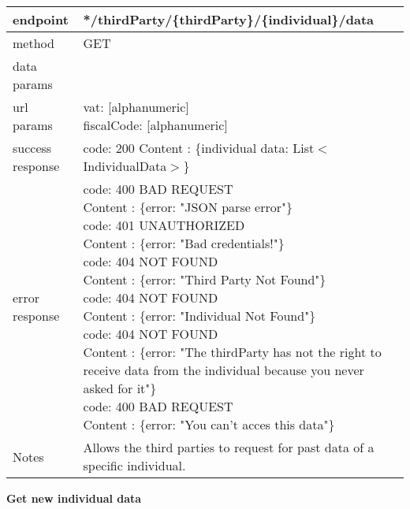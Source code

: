 	\begin{tabularx}{\linewidth}{| l| l }
		\hline
		endpoint & */thirdParty/\{thirdParty\}/\{individual\}/data \\
		\hline
		method & GET \\
		\hline
		data params & \\
		\hline
		url params &
		\parbox{0.7\textwidth}{
			\bigskip
			vat: [alphanumeric]\\
			fiscalCode: [alphanumeric]
			\bigskip
		} \\
		\hline
		success response &
		\parbox{0.7\textwidth}{
			\bigskip
			code: 200\\
			Content : \{individual data: List$<$IndividualData$>$\}
			\bigskip
		} \\
		\hline
		error response &
		\parbox{0.7\textwidth}{
			\bigskip
			code: 400 BAD REQUEST \\
			Content : \{error: "JSON parse error"\}\\
			code: 401 UNAUTHORIZED \\
			Content : \{error: "Bad credentials!"\}\\
			code: 404 NOT FOUND \\
			Content : \{error: "Third Party Not Found"\}\\
			code: 404 NOT FOUND \\
			Content : \{error: "Individual Not Found"\}\\
			code: 404 NOT FOUND \\
			Content : \{error: "The thirdParty has not the right to receive data from the individual because you never asked for it"\}\\
			code: 400 BAD REQUEST \\
			Content : \{error: "You can't acces this data"\}\\
			\bigskip
		} \\
		\hline
		Notes & 
		\parbox{0.7\textwidth}{
			\bigskip Allows the third parties to request for past data of a specific individual.
		\bigskip}  \\
		\hline
	\end{tabularx}
	
	\textbf{Get new individual data} \\

